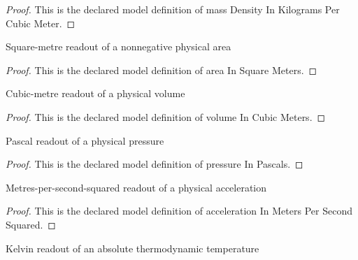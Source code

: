 \begin{proof}
  This is the declared model definition of mass Density In Kilograms Per Cubic Meter.
\end{proof}
\begin{definition}
  \label{def:physics:phyx-mini-0407:phyxminiproblems-problemphyxmini0407-areainsquaremeters}
  Square-metre readout of a nonnegative physical area
\end{definition}
\begin{proof}
  This is the declared model definition of area In Square Meters.
\end{proof}
\begin{definition}
  \label{def:physics:phyx-mini-0407:phyxminiproblems-problemphyxmini0407-volumeincubicmeters}
  Cubic-metre readout of a physical volume
\end{definition}
\begin{proof}
  This is the declared model definition of volume In Cubic Meters.
\end{proof}
\begin{definition}
  \label{def:physics:phyx-mini-0407:phyxminiproblems-problemphyxmini0407-pressureinpascals}
  Pascal readout of a physical pressure
\end{definition}
\begin{proof}
  This is the declared model definition of pressure In Pascals.
\end{proof}
\begin{definition}
  \label{def:physics:phyx-mini-0407:phyxminiproblems-problemphyxmini0407-accelerationinmeterspersecondsquared}
  Metres-per-second-squared readout of a physical acceleration
\end{definition}
\begin{proof}
  This is the declared model definition of acceleration In Meters Per Second Squared.
\end{proof}
\begin{definition}
  \label{def:physics:phyx-mini-0407:phyxminiproblems-problemphyxmini0407-temperatureinkelvins}
  Kelvin readout of an absolute thermodynamic temperature
\end{definition}
